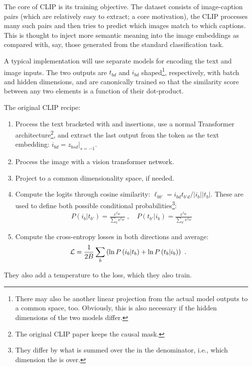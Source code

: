 \documentclass[11pt]{article}
\begin{document}
The core of CLIP is its training objective. The dataset consists of image-caption pairs (which are
relatively easy to extract; a core motivation), the CLIP processes many such pairs and then tries to
predict which images match to which captions. This is thought to inject more semantic meaning into
the image embeddings as compared with, say, those generated from the standard classification task.

A typical implementation will use separate models for encoding the text and image inputs. The two
outputs are $ t _{ bd } $ and $ i _{ bd } $ shaped\footnote{There may also be another linear
projection from the actual model outputs to a common space, too. Obviously, this is also necessary
if the hidden dimensions of the two models differ.}, respectively, with batch and hidden dimensions,
and are canonically trained so that the similarity score between any two elements is a function of
their dot-product.

The original CLIP recipe:
\begin{enumerate}
    \item Process the text bracketed with \pyinline{[SOS]} and \pyinline{[EOS]} insertions, use a
        normal Transformer architecture\footnote{The original CLIP paper keeps the causal mask.},
        and extract the last output from the \pyinline{[EOS]} token as the text embedding: $ i _{ bd
        }= z _{ bsd }\big|_{ s=-1 } $.
    \item Process the image with a vision transformer network.
    \item Project to a common dimensionality space, if needed.
    \item Compute the logits through cosine similarity: $ \ell _{ b b' } = i _{ bd }t _{ b'd }/ |i _{ b }||t _{ b }| $. These are used to
        define both possible conditional probabilities\footnote{They differ by what is summed over
        the in the denominator, i.e., which dimension the  is over.}:
        \begin{align}
         P(i_b|t _{ b' }) =  \frac{ e ^{ \ell _{b b'} } }{ \sum _{ b  } e ^{ \ell _{b b'} } }  \ ,
         \quad P(t _{ b' }| i _{ b }) =  \frac{ e ^{ \ell _{b b'} } }{ \sum _{ b' }  e ^{ \ell _{b b'} } }
        \end{align}
    \item Compute the cross-entropy losses in both directions and average:
        \begin{align}
           \mathcal{L}  &= \frac{ 1 }{ 2B }\sum _{ b } \left (\ln P \left ( i_b|t_b \right ) + \ln P \left ( t_b|i_b \right )\right ) \label{eq_clip_loss} \ .
        \end{align}
\end{enumerate}
They also add a temperature to the loss, which they also train.
\end{document}
